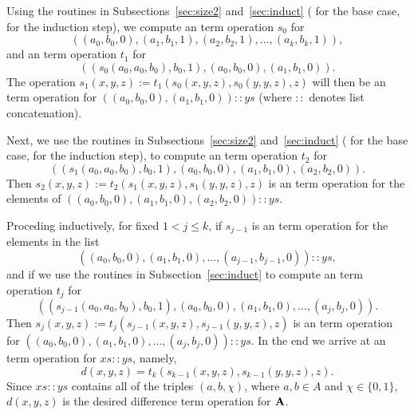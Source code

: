 Using the routines in Subsections~\ref{sec:size2}
and~\ref{sec:induct} 
( for the base case,  for the induction step),
we compute an \ld term operation $s_0$ for
\begin{equation*}
((a_0, b_0, 0), (a_1, b_1, 1), (a_2, b_2, 1), \dots, (a_k, b_k, 1)),  
\end{equation*}
and an \ld term operation $t_1$ for
\begin{equation*}
((s_0(a_0, a_0, b_0), b_0, 1), (a_0, b_0, 0),(a_1, b_1, 0)). 
\end{equation*}
The operation $s_1(x,y,z) := t_1(s_0(x,y,z), s_0(y,y,z), z)$ will then be
an \ld term operation for
$((a_0, b_0, 0), (a_1, b_1, 0)) :: ys$  (where $::$ denotes
list concatenation).

Next, we use the routines in Subsections~\ref{sec:size2}
and~\ref{sec:induct} 
( for the base case,  for the induction step),
to compute an \ld term operation $t_2$ for
\begin{equation*}
((s_1(a_0, a_0, b_0), b_0, 1), (a_0, b_0, 0),(a_1, b_1, 0),(a_2, b_2, 0)). 
\end{equation*}
Then $s_2(x,y,z) := t_2(s_1(x,y,z), s_1(y,y,z), z)$ is an \ld term operation
for the elements of
$((a_0, b_0, 0), (a_1, b_1, 0), (a_2, b_2, 0)) :: ys$.

Proceding inductively, for fixed $1<j\leq k$, 
if $s_{j-1}$ is an \ld term operation 
for the elements in the list
\begin{equation*}
((a_0, b_0, 0), (a_1, b_1, 0), \dots, (a_{j-1}, b_{j-1}, 0)) :: ys,
\end{equation*}
and if we use the routines in Subsection~\ref{sec:induct} 
to compute an \ld term operation $t_j$ for
\begin{equation*}
((s_{j-1}(a_0, a_0, b_0), b_0, 1), (a_0, b_0, 0),(a_1, b_1, 0),\dots, 
(a_j, b_j, 0)). 
\end{equation*}
Then $s_j(x,y,z) := t_j(s_{j-1}(x,y,z), s_{j-1}(y,y,z), z)$ is an \ld term 
operation for 
$((a_0, b_0, 0), (a_1, b_1, 0), \dots, (a_j, b_j, 0)) :: ys$.
In the end we arrive at an \ld term operation for $xs :: ys$, namely,
\begin{equation*}
d(x,y,z) = t_k(s_{k-1}(x,y,z), s_{k-1}(y,y,z), z).
\end{equation*}
Since $xs :: ys$ contains all of the triples $(a,b,\chi)$, where
$a, b \in A$ and $\chi \in \{0,1\}$, 
$d(x,y,z)$ is the desired difference term operation for $\mathbf{A}$.



